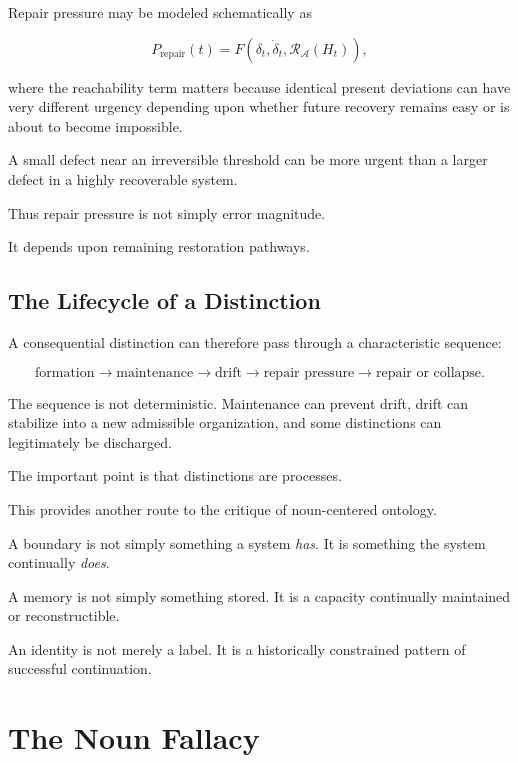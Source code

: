 \documentclass[11pt]{article}
\theoremstyle{remark}
\newcommand{\Adm}{\mathcal{A}}
\newcommand{\Reach}{\mathcal{R}}
\begin{document}
Repair pressure may be modeled schematically as

\begin{equation}
P_{\mathrm{repair}}(t)
=
F(\delta_t,\dot{\delta}_t,\Reach_{\Adm}(H_t)),
\end{equation}

where the reachability term matters because identical present deviations can have very different urgency depending upon whether future recovery remains easy or is about to become impossible.

A small defect near an irreversible threshold can be more urgent than a larger defect in a highly recoverable system.

Thus repair pressure is not simply error magnitude.

It depends upon remaining restoration pathways.

\subsection{The Lifecycle of a Distinction}

A consequential distinction can therefore pass through a characteristic sequence:

\begin{equation}
\text{formation}
\rightarrow
\text{maintenance}
\rightarrow
\text{drift}
\rightarrow
\text{repair pressure}
\rightarrow
\text{repair or collapse}.
\end{equation}

The sequence is not deterministic. Maintenance can prevent drift, drift can stabilize into a new admissible organization, and some distinctions can legitimately be discharged.

The important point is that distinctions are processes.

This provides another route to the critique of noun-centered ontology.

A boundary is not simply something a system \emph{has}. It is something the system continually \emph{does}.

A memory is not simply something stored. It is a capacity continually maintained or reconstructible.

An identity is not merely a label. It is a historically constrained pattern of successful continuation.

\section{The Noun Fallacy}
\end{document}
